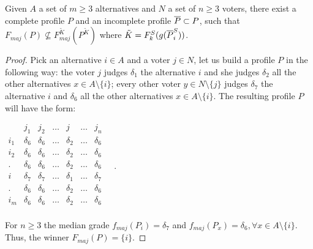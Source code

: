 \documentclass[version=3.21, pagesize, twoside=off, bibliography=totoc, DIV=calc, fontsize=12pt, a4paper]{scrartcl}
\begin{document}
\begin{proposition}
	\label{prop:notsamewinner}
	Given $A$ a set of $m\geq 3$ alternatives and $N$ a set of $n\geq3$ voters, there exist a complete profile $P$ and an incomplete profile $\overline{P} \subset P$, such that $F_{maj}(P) \nsubseteq F^{\tilde{K}}_{maj}(P^{\tilde{K}})$ \textemdash where $\tilde{K}=F^S_k(g(\overline{P}^S_i))$.
\end{proposition}
\begin{proof}
	Pick an alternative $i\in A$ and a voter $j \in N$, let us build a profile $P$ in the following way: the voter $j$ judges $\delta_1$ the alternative $i$ and she judges $\delta_2$ all the other alternatives $x \in A \setminus \{i\}$; every other voter $y\in N \setminus \{j\}$ judges $\delta_7$ the alternative $i$ and $\delta_6$ all the other alternatives $x \in A \setminus \{i\}$. The resulting profile $P$ will have the form:
	\begin{center}
		$
		\begin{array}{ccccccc}
			& j_1 & j_2 & \dots & j & \dots & j_n \\
			i_1 &	\delta_6 & \delta_6 & \dots & \delta_2 & \dots & \delta_6 \\
			i_2 &	\delta_6 & \delta_6 & \dots & \delta_2 & \dots & \delta_6 \\
			. &	\delta_6 & \delta_6 & \dots & \delta_2 & \dots & \delta_6 \\
			i &	\delta_7 & \delta_7 & \dots & \delta_1 & \dots & \delta_7 \\
			. &	\delta_6 & \delta_6 & \dots & \delta_2 & \dots & \delta_6 \\
			i_m &	\delta_6 & \delta_6 & \dots & \delta_2 & \dots & \delta_6 \\
		\end{array} \quad.
		$
	\end{center}
	For $n\geq 3$ the median grade $f_{maj}(P_i)=\delta_7$ and $f_{maj}(P_x)=\delta_6, \forall x \in A \setminus \{i\}$. Thus, the winner $F_{maj}(P)=\{i\}$.
	

\end{proof}
\end{document}

